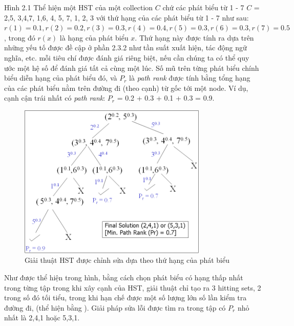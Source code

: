 		\hspace*{.05\textwidth} Hình 2.1 Thể hiện một HST của một collection $C$ chứ các phát biểu từ 1 - 7  $C$ = {{2,5}, {3,4,7}, {1,6}, {4, 5, 7}, {1, 2, 3}} với thứ hạng của các phát biểu từ 1 - 7 như sau: $r(1) = 0.1, r(2) = 0.2, r(3) = 0.3, r(4) = 0.4, r(5) = 0.3, r(6) = 0.3, r(7) = 0.5$, trong đó $r(x)$ là hạng của phát biểu $x$. Thứ hạng này được tính ra dựa trên những yếu tố được đề cập ở phần 2.3.2 như tần suất xuất hiện, tác động ngữ nghĩa, etc. mỗi tiêu chí được đánh giá riêng biệt, nếu cần chúng ta có thể quy ước một hệ số để đánh giá tất cả cùng một lúc. Số mũ trên từng phát biểu chính biểu diễn hạng của phát biểu đó, và $P_{r}$ là \textit{path rank} được tính bằng tổng hạng của các phát biểu nằm trên đường đi (theo cạnh) từ gốc tới một node. Ví dụ, cạnh cận trái nhất có \textit{path rank}: $P_{r}$ = 0.2 + 0.3 + 0.1 + 0.3 = 0.9.
		\begin{figure}[ht!]
			\centering
			\includegraphics[width=90mm]{Figures/fig1.png}
			\caption{Giải thuật HST được chỉnh sửa dựa theo thứ hạng của phát biểu \label{overflow}}
		\end{figure}
		
		\hspace*{.05\textwidth} Như được thể hiện trong hình, bằng cách chọn phát biểu có hạng thấp nhất trong từng tập trong khi xây cạnh của HST, giải thuật chỉ tạo ra 3 hitting sets, 2 trong số đó tối tiểu, trong khi hạn chế được một số lượng lớn số lần kiểm tra đường đi, (thể hiện bằng \xmark). Giải pháp sửa lỗi được tìm ra trong tập có $P_{r}$ nhỏ nhất là {2,4,1} hoặc {5,3,1}.
		
